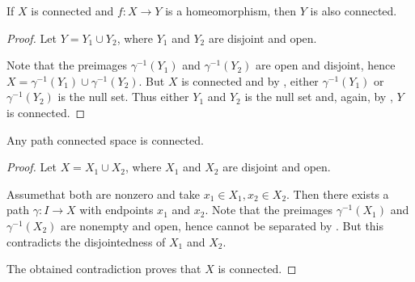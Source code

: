 \begin{proposition}\label{thm:homomorphism_preserves_connectedness}
  If \( X \) is connected and \( f: X \to Y \) is a homeomorphism, then \( Y \) is also connected.
\end{proposition}
\begin{proof}
  Let \( Y = Y_1 \cup Y_2 \), where \( Y_1 \) and \( Y_2 \) are disjoint and open.

  Note that the preimages \( \gamma^{-1}(Y_1) \) and \( \gamma^{-1}(Y_2) \) are open and disjoint, hence \( X = \gamma^{-1}(Y_1) \cup \gamma^{-1}(Y_2) \). But \( X \) is connected and by , either \( \gamma^{-1}(Y_1) \) or \( \gamma^{-1}(Y_2) \) is the null set. Thus either \( Y_1 \) and \( Y_2 \) is the null set and, again, by , \( Y \) is connected.
\end{proof}

\begin{proposition}\label{thm:path_connected_implies_connected}
  Any path connected space is connected.
\end{proposition}
\begin{proof}
  Let \( X = X_1 \cup X_2 \), where \( X_1 \) and \( X_2 \) are disjoint and open.

  Assume\DNE that both are nonzero and take \( x_1 \in X_1, x_2 \in X_2 \). Then there exists a path \( \gamma: I \to X \) with endpoints \( x_1 \) and \( x_2 \). Note that the preimages \( \gamma^{-1}(X_1) \) and \( \gamma^{-1}(X_2) \) are nonempty and open, hence cannot be separated by . But this contradicts the disjointedness of \( X_1 \) and \( X_2 \).

  The obtained contradiction proves that \( X \) is connected.
\end{proof}
